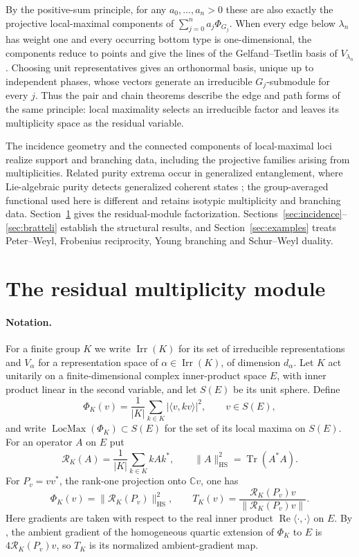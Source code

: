 \documentclass[10pt]{amsart}
\theoremstyle{remark}
\DeclareMathOperator{\Irr}{Irr}
\DeclareMathOperator{\Tr}{Tr}
\DeclareMathOperator{\LocMax}{LocMax}
\newcommand{\C}{\mathbb C}
\newcommand{\norm}[1]{\lVert #1\rVert}
\newcommand{\ip}[2]{\langle #1,#2\rangle}
\begin{document}
By the positive-sum principle, for any $a_0,\ldots,a_n>0$ these are also exactly the
projective local-maximal components of $\sum_{j=0}^{n}a_j\Phi_{G_j}$.
When every edge below $\lambda_n$ has weight one and every
occurring bottom type is one-dimensional, the components
reduce to points and give the lines of the Gelfand--Tsetlin basis
of $V_{\lambda_n}$. Choosing unit representatives gives an orthonormal basis, unique up to
independent phases, whose vectors generate an irreducible $G_j$-submodule for every $j$.
Thus the pair and chain theorems describe the edge and path
forms of the same principle: local maximality selects an
irreducible factor and leaves its multiplicity space as
the residual variable.

The incidence geometry and the connected components of local-maximal loci realize
support and branching data, including the projective families arising from multiplicities.
Related purity extrema occur in generalized entanglement, where Lie-algebraic purity detects generalized coherent states
\cite{BarnumKnillOrtizViola2003}; the group-averaged functional used here is different and retains
isotypic multiplicity and branching data. Section~\ref{sec:nested} gives the residual-module
factorization. Sections~\ref{sec:incidence}--\ref{sec:bratteli} establish the structural results, and
Section~\ref{sec:examples} treats Peter--Weyl, Frobenius reciprocity, Young branching and Schur--Weyl
duality.

\section{The residual multiplicity module}\label{sec:nested}

\paragraph{Notation.}
For a finite group $K$ we write $\Irr(K)$ for its set of irreducible
representations and $V_\alpha$ for a representation space of $\alpha\in\Irr(K)$, of dimension $d_\alpha$.
Let $K$ act unitarily on a finite-dimensional complex inner-product space $E$, with inner product linear in
the second variable, and let $S(E)$ be its unit sphere. Define
\[
 \Phi_K(v)=\frac1{|K|}\sum_{k\in K}|\ip{v}{kv}|^2,\qquad v\in S(E),
\]
and write $\LocMax(\Phi_K)\subset S(E)$ for the set of its local maxima on $S(E)$. For an operator $A$ on
$E$ put
\[
 \mathcal R_K(A)=\frac1{|K|}\sum_{k\in K}kAk^*,
 \qquad
 \norm{A}_{\mathrm{HS}}^2=\Tr(A^*A).
\]
For $P_v=vv^*$, the rank-one projection onto $\C v$, one has
\begin{equation}\label{eq:avg-gradient}
 \Phi_K(v)=\norm{\mathcal R_K(P_v)}_{\mathrm{HS}}^2,
 \qquad
 T_K(v)=\frac{\mathcal R_K(P_v)v}{\norm{\mathcal R_K(P_v)v}}.
\end{equation}
Here gradients are taken with respect to the real inner
product $\operatorname{Re}\langle\cdot,\cdot\rangle$ on $E$.
By \cite[Lemma~1(d)]{HungKang2026},
the ambient gradient of the homogeneous quartic extension
of $\Phi_K$ to $E$ is $4\mathcal R_K(P_v)v$, so $T_K$ is its
normalized ambient-gradient map.
\end{document}
